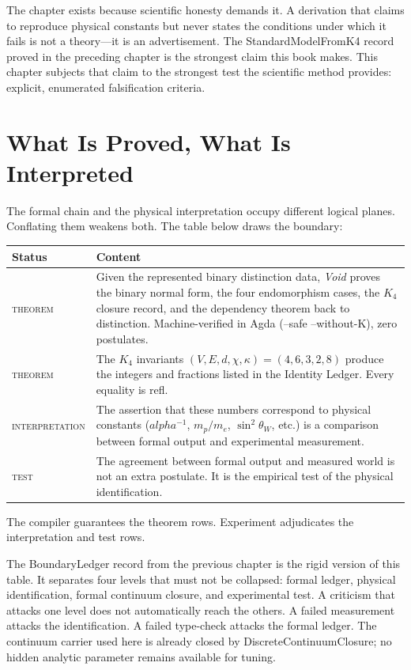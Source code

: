 \documentclass[11pt,a4paper]{book}
\def\alpha{alpha}%
\def\texttt#1{#1}%
\begin{document}
The chapter exists because scientific honesty demands it. A derivation that claims to reproduce physical constants but never states the conditions under which it fails is not a theory---it is an advertisement. The \texttt{StandardModelFromK4} record proved in the preceding chapter is the strongest claim this book makes. This chapter subjects that claim to the strongest test the scientific method provides: explicit, enumerated falsification criteria.

\section*{What Is Proved, What Is Interpreted}

The formal chain and the physical interpretation occupy different logical planes. Conflating them weakens both. The table below draws the boundary:

\begin{center}
\begin{tabular}{lp{10cm}}
\toprule
\textbf{Status} & \textbf{Content} \\
\midrule
\textsc{theorem} & Given the represented binary distinction data, \textit{Void} proves the binary normal form, the four endomorphism cases, the $K_4$ closure record, and the dependency theorem back to distinction. Machine-verified in Agda (\texttt{--safe --without-K}), zero postulates. \\
\textsc{theorem} & The $K_4$ invariants $(V,E,d,\chi,\kappa) = (4,6,3,2,8)$ produce the integers and fractions listed in the Identity Ledger. Every equality is \texttt{refl}. \\
\textsc{interpretation} & The assertion that these numbers correspond to physical constants ($\alpha^{-1}$, $m_p/m_e$, $\sin^2\!\theta_W$, etc.) is a comparison between formal output and experimental measurement. \\
\textsc{test} & The agreement between formal output and measured world is not an extra postulate. It is the empirical test of the physical identification. \\
\bottomrule
\end{tabular}
\end{center}

The compiler guarantees the theorem rows. Experiment adjudicates the interpretation and test rows.

The \texttt{BoundaryLedger} record from the previous chapter is the rigid version of this table. It separates four levels that must not be collapsed: formal ledger, physical identification, formal continuum closure, and experimental test. A criticism that attacks one level does not automatically reach the others. A failed measurement attacks the identification. A failed type-check attacks the formal ledger. The continuum carrier used here is already closed by \texttt{DiscreteContinuumClosure}; no hidden analytic parameter remains available for tuning.
\end{document}
